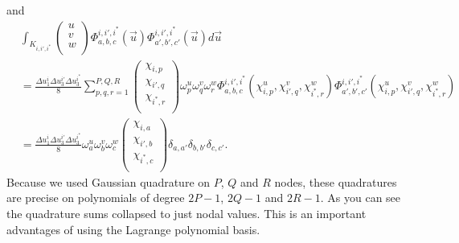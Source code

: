 %
and
%
\begin{align*}
&\int_{K_{i,i',i^*}}
\left(
\begin{array}{c}
u \\
v \\
w \\
\end{array} \right)
\Phi^{i,i',i^*}_{a,b,c}(\vec{u}) \Phi^{i,i',i^*}_{a',b',c'}(\vec{u}) d\vec{u}\\
&= \frac{\Delta u_1^i \Delta u_3^{i'} \Delta u_3^{i^*}}{8} \sum_{p,q,r=1}^{P,Q,R} \left(
\begin{array}{c}
\chi_{i,p} \\
\chi_{i',q} \\
\chi_{i^*,r} \\
\end{array}
\right) \omega_p^u \omega_q^v \omega_r^w \Phi^{i,i',i^*}_{a,b,c}(\chi_{i,p}^u,\chi_{i',q}^v,\chi_{i^*,r}^w) \Phi^{i,i',i^*}_{a',b',c'}(\chi_{i,p}^u,\chi_{i',q}^v,\chi_{i^*,r}^w)\\
&= \frac{\Delta u_1^i \Delta u_3^{i'} \Delta u_3^{i^*}}{8} \omega_a^u \omega_b^v \omega_c^w \left(
\begin{array}{c}
\chi_{i,a} \\
\chi_{i',b} \\
\chi_{i^*,c} \\
\end{array}
\right)
\delta_{a,a'} \delta_{b,b'} \delta_{c,c'}.
\end{align*}
%
Because we used Gaussian quadrature on $P$, $Q$ and $R$ nodes, these quadratures are precise on polynomials of degree $2P-1$, $2Q-1$ and $2R-1$. As you can see the quadrature sums collapsed to just nodal values. This is an important advantages of using the Lagrange polynomial basis.
